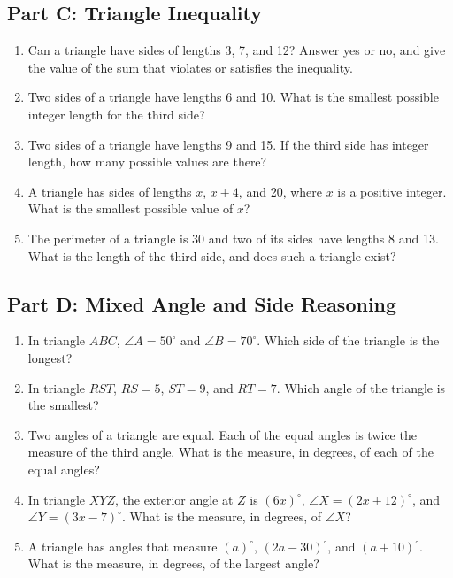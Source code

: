 \documentclass[14pt]{extarticle}
\begin{document}
\subsection*{Part C: Triangle Inequality}
\begin{enumerate}
  \item Can a triangle have sides of lengths 3, 7, and 12? Answer yes or no, and give the value of the sum that violates or satisfies the inequality.
  \item Two sides of a triangle have lengths 6 and 10. What is the smallest possible integer length for the third side?
  \item Two sides of a triangle have lengths 9 and 15. If the third side has integer length, how many possible values are there?
  \item A triangle has sides of lengths \(x\), \(x + 4\), and 20, where \(x\) is a positive integer. What is the smallest possible value of \(x\)?
  \item The perimeter of a triangle is 30 and two of its sides have lengths 8 and 13. What is the length of the third side, and does such a triangle exist?
\end{enumerate}

\subsection*{Part D: Mixed Angle and Side Reasoning}
\begin{enumerate}
  \item In triangle \(ABC\), \(\angle A = 50^\circ\) and \(\angle B = 70^\circ\). Which side of the triangle is the longest?
  \item In triangle \(RST\), \(RS = 5\), \(ST = 9\), and \(RT = 7\). Which angle of the triangle is the smallest?
  \item Two angles of a triangle are equal. Each of the equal angles is twice the measure of the third angle. What is the measure, in degrees, of each of the equal angles?
  \item In triangle \(XYZ\), the exterior angle at \(Z\) is \((6x)^\circ\), \(\angle X = (2x + 12)^\circ\), and \(\angle Y = (3x - 7)^\circ\). What is the measure, in degrees, of \(\angle X\)?
  \item A triangle has angles that measure \((a)^\circ\), \((2a - 30)^\circ\), and \((a + 10)^\circ\). What is the measure, in degrees, of the largest angle?
\end{enumerate}
\end{document}
